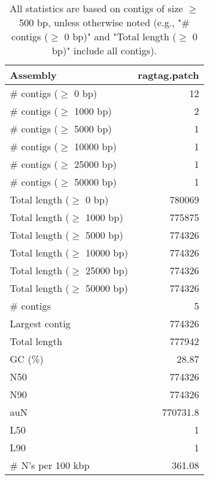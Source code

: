 \documentclass[12pt,a4paper]{article}
\begin{document}
\begin{table}[ht]
\begin{center}
\caption{All statistics are based on contigs of size $\geq$ 500 bp, unless otherwise noted (e.g., "\# contigs ($\geq$ 0 bp)" and "Total length ($\geq$ 0 bp)" include all contigs).}
\begin{tabular}{|l*{1}{|r}|}
\hline
Assembly & ragtag.patch \\ \hline
\# contigs ($\geq$ 0 bp) & 12 \\ \hline
\# contigs ($\geq$ 1000 bp) & 2 \\ \hline
\# contigs ($\geq$ 5000 bp) & 1 \\ \hline
\# contigs ($\geq$ 10000 bp) & 1 \\ \hline
\# contigs ($\geq$ 25000 bp) & 1 \\ \hline
\# contigs ($\geq$ 50000 bp) & 1 \\ \hline
Total length ($\geq$ 0 bp) & 780069 \\ \hline
Total length ($\geq$ 1000 bp) & 775875 \\ \hline
Total length ($\geq$ 5000 bp) & 774326 \\ \hline
Total length ($\geq$ 10000 bp) & 774326 \\ \hline
Total length ($\geq$ 25000 bp) & 774326 \\ \hline
Total length ($\geq$ 50000 bp) & 774326 \\ \hline
\# contigs & 5 \\ \hline
Largest contig & 774326 \\ \hline
Total length & 777942 \\ \hline
GC (\%) & 28.87 \\ \hline
N50 & 774326 \\ \hline
N90 & 774326 \\ \hline
auN & 770731.8 \\ \hline
L50 & 1 \\ \hline
L90 & 1 \\ \hline
\# N's per 100 kbp & 361.08 \\ \hline
\end{tabular}
\end{center}
\end{table}
\end{document}
